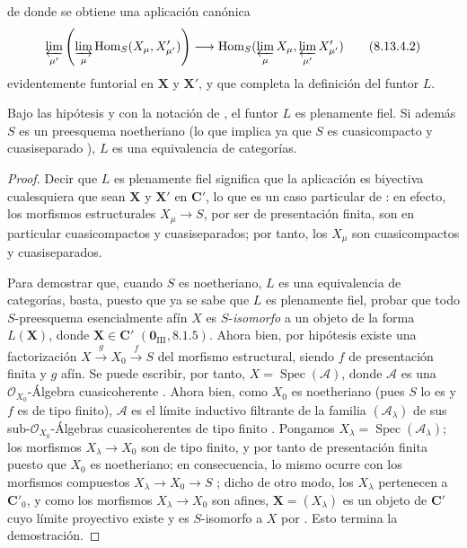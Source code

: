\begin{env}[8.13.4]
de donde se obtiene una aplicación canónica
\begin{equation}
\label{IV.8.13.4.2-fr}
\varprojlim_{\mu'}\left(\varinjlim_\mu
\operatorname{Hom}_S(X_\mu,X'_{\mu'})\right)
\longrightarrow
\operatorname{Hom}_S(\varprojlim_\mu X_\mu,
\varprojlim_{\mu'}X'_{\mu'}) \tag{8.13.4.2}
\end{equation}
evidentemente funtorial en $\mathbf X$ y $\mathbf X'$, y que completa la definición del funtor $L$.
\end{env}

\begin{proposition}[8.13.5]
\label{IV.8.13.5-fr}
Bajo las hipótesis y con la notación de , el funtor $L$ es plenamente fiel.
Si además $S$ es un preesquema noetheriano \textup{(lo que implica ya que $S$ es cuasicompacto y cuasiseparado )}, $L$ es una equivalencia de categorías.
\end{proposition}

\begin{proof}
Decir que $L$ es plenamente fiel significa que la aplicación  es biyectiva cualesquiera que sean $\mathbf X$ y $\mathbf X'$ en $\boldsymbol{C}'$, lo que es un caso particular de : en efecto, los morfismos estructurales $X_\mu\to S$, por ser de presentación finita, son en particular cuasicompactos y cuasiseparados; por tanto, los $X_\mu$ son cuasicompactos y cuasiseparados.

Para demostrar que, cuando $S$ es noetheriano, $L$ es una equivalencia de categorías, basta, puesto que ya se sabe que $L$ es plenamente fiel, probar que todo $S$-preesquema esencialmente afín $X$ es $S$-\emph{isomorfo} a un objeto de la forma $L(\mathbf X)$, donde $\mathbf X\in\boldsymbol{C}'$ $(\mathbf 0_{\mathrm{III}},8.1.5)$.
Ahora bien, por hipótesis existe una factorización $X\xrightarrow{g}X_0\xrightarrow{f}S$ del morfismo estructural, siendo $f$ de presentación finita y $g$ afín.
Se puede escribir, por tanto, $X=\operatorname{Spec}(\mathcal A)$, donde $\mathcal A$ es una $\mathcal O_{X_0}$-Álgebra cuasicoherente .
Ahora bien, como $X_0$ es noetheriano (pues $S$ lo es y $f$ es de tipo finito), $\mathcal A$ es el límite inductivo filtrante de la familia $(\mathcal A_\lambda)$ de sus sub-$\mathcal O_{X_0}$-Álgebras cuasicoherentes de tipo finito .
Pongamos $X_\lambda=\operatorname{Spec}(\mathcal A_\lambda)$; los morfismos $X_\lambda\to X_0$ son de tipo finito, y por tanto de presentación finita puesto que $X_0$ es noetheriano; en consecuencia, lo mismo ocurre con los morfismos compuestos $X_\lambda\to X_0\to S$ ; dicho de otro modo, los $X_\lambda$ pertenecen a $\boldsymbol{C}'_0$, y como los morfismos $X_\lambda\to X_0$ son afines, $\mathbf X=(X_\lambda)$ es un objeto de $\boldsymbol{C}'$ cuyo límite proyectivo existe y es $S$-isomorfo a $X$ por .
Esto termina la demostración.
\end{proof}

